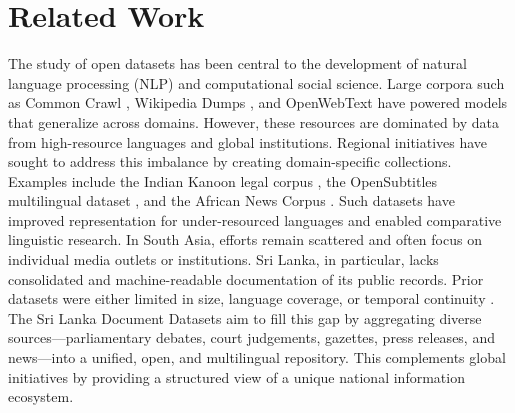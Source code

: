 \documentclass[10pt,a4paper]{article}%
\begin{document}
%
\section{Related Work}%
\label{sec:RelatedWork}%
The study of open datasets has been central to the development of natural language processing (NLP) and computational social science. Large corpora such as Common Crawl%
\cite{commoncrawl2020}%
, Wikipedia Dumps%
\cite{wikidumps2018}%
, and OpenWebText%
\cite{openwebtext2019}%
have powered models that generalize across domains. However, these resources are dominated by data from high{-}resource languages and global institutions.%
\newline%
\newline%
Regional initiatives have sought to address this imbalance by creating domain{-}specific collections. Examples include the Indian Kanoon legal corpus%
\cite{indiankanoon2018}%
, the OpenSubtitles multilingual dataset%
\cite{opensubtitles2016}%
, and the African News Corpus%
\cite{africannews2021}%
. Such datasets have improved representation for under{-}resourced languages and enabled comparative linguistic research.%
\newline%
\newline%
In South Asia, efforts remain scattered and often focus on individual media outlets or institutions. Sri Lanka, in particular, lacks consolidated and machine{-}readable documentation of its public records. Prior datasets were either limited in size, language coverage, or temporal continuity%
\cite{sltalk2023}%
%
\cite{srilankanlp2022}%
.%
\newline%
\newline%
The Sri Lanka Document Datasets aim to fill this gap by aggregating diverse sources—parliamentary debates, court judgements, gazettes, press releases, and news—into a unified, open, and multilingual repository. This complements global initiatives by providing a structured view of a unique national information ecosystem.%
\newline%
\newline

%
\end{document}
